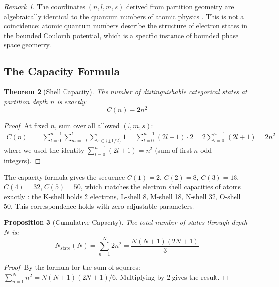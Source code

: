 \documentclass[11pt,twocolumn,a4paper]{article}
\newtheorem{theorem}{Theorem}[section]
\newtheorem{proposition}[theorem]{Proposition}
\theoremstyle{definition}
\theoremstyle{remark}
\newtheorem{remark}[theorem]{Remark}
\begin{document}
\begin{remark}
The coordinates $(n, l, m, s)$ derived from partition geometry are algebraically identical to the quantum numbers of atomic physics \citep{griffiths2018}. This is not a coincidence: atomic quantum numbers describe the structure of electron states in the bounded Coulomb potential, which is a specific instance of bounded phase space geometry.
\end{remark}

\subsection{The Capacity Formula}

\begin{theorem}[Shell Capacity]
\label{thm:capacity}
The number of distinguishable categorical states at partition depth $n$ is exactly:
\begin{equation}
C(n) = 2n^2
\label{eq:capacity}
\end{equation}
\end{theorem}

\begin{proof}
At fixed $n$, sum over all allowed $(l, m, s)$:
\begin{align}
C(n) &= \sum_{l=0}^{n-1} \sum_{m=-l}^{l} \sum_{s \in \{\pm 1/2\}} 1 = \sum_{l=0}^{n-1} (2l+1) \cdot 2 = 2 \sum_{l=0}^{n-1} (2l+1) = 2n^2
\end{align}
where we used the identity $\sum_{l=0}^{n-1} (2l+1) = n^2$ (sum of first $n$ odd integers).
\end{proof}

The capacity formula gives the sequence $C(1) = 2$, $C(2) = 8$, $C(3) = 18$, $C(4) = 32$, $C(5) = 50$, which matches the electron shell capacities of atoms exactly \citep{bohr1913, pauli1925}: the K-shell holds 2 electrons, L-shell 8, M-shell 18, N-shell 32, O-shell 50. This correspondence holds with zero adjustable parameters.

\begin{proposition}[Cumulative Capacity]
\label{prop:cumulative}
The total number of states through depth $N$ is:
\begin{equation}
N_{\mathrm{state}}(N) = \sum_{n=1}^{N} 2n^2 = \frac{N(N+1)(2N+1)}{3}
\label{eq:cumulative}
\end{equation}
\end{proposition}

\begin{proof}
By the formula for the sum of squares: $\sum_{n=1}^{N} n^2 = N(N+1)(2N+1)/6$. Multiplying by 2 gives the result.
\end{proof}
\end{document}
